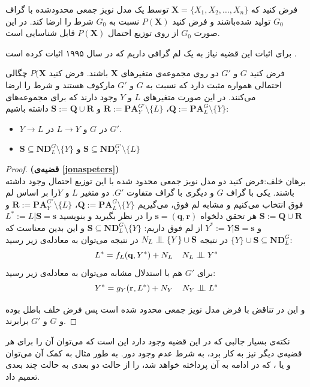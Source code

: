 \documentclass{article}
\begin{document}
\begin{thm}\label{jonaspeters}
فرض کنید که 
$\mathbf{X} = \{X_1, X_2, \dots, X_n\}$
توسط یک مدل‌ نویز جمعی محدود‌شده با گراف $G_0$ تولید شده‌باشند و فرض کنید 
$P(\mathbf{X})$
نسبت به $G_0$ شرط 
را ارضا کند. در این صورت $G_0$ از روی توزیع احتمال $P(\mathbf{X})$ قابل شناسایی است. 
\end{thm}
برای اثبات این قضیه نیاز به یک لم‌ گرافی داریم که 
در سال ۱۹۹۵ اثبات کرده است 
\cite{chickering}.
\begin{lem}
فرض کنید $G$ و $G'$ دو 
روی مجموعه‌ی متغیر‌های  
$\mathbf{X}$
باشند. فرض کنید 
$P(\mathbf{X}$
چگالی احتمالی همواره مثبت دارد که نسبت به $G$ و   $G'$ مارکوف هستند و شرط
را ارضا می‌کنند. در این صورت متغیر‌های $L$ و $Y$  وجود دارند که برای مجموعه‌های 
$\mathbf{Q} := \mathbf{PA}_L^{G}\setminus\{Y\}$،
$\mathbf{R} := \mathbf{PA}_Y^{G'}\setminus\{L\}$
و 
$\mathbf{S} := \mathbf{Q} \cup \mathbf{R} $
داشته باشیم:
\begin{itemize}
\item
$Y \rightarrow L$
	در $G$ و 
$L \rightarrow Y$
	در $G'$.
\item 
$\mathbf{S} \subseteq \mathbf{ND}_L^G \setminus\{Y\}$
	و 
$\mathbf{S}\subseteq  \mathbf{ND}_Y^{G'} \setminus\{L\} $ 
\end{itemize}
\end{lem}

\begin{proof}
	\textbf{
	(قضیه‌ی 
	\eqref{jonaspeters})}
\\
برهان خلف:‌فرض کنید دو مدل نویز جمعی محدود شده با این توزیع احتمال وجود داشته باشند. یکی با گراف $G$ و دیگری با  گراف  متفاوت $G'$. دو متغیر $L$ و $Y$را بر اساس لم فوق انتخاب می‌کنیم و مشابه لم فوق، می‌گیریم
$\mathbf{Q} := \mathbf{PA}_L^{G}\setminus\{Y\}$،
$\mathbf{R} := \mathbf{PA}_Y^{G'}\setminus\{L\}$
و 
$\mathbf{S} := \mathbf{Q} \cup \mathbf{R} $
هر تحقق دلخواه 
$\mathbf{s} = (\mathbf{q}, \mathbf{r})$
را در نظر بگیرید و بنویسید
$L^* := L|\mathbf{S}= \mathbf{s}$
و 
$Y^* := Y|\mathbf{S}= \mathbf{s}$
از لم فوق داریم:
$\mathbf{S} \subseteq \mathbf{ND}_L^G \setminus\{Y\}$
 و این بدین معناست که 
 $\{Y\} \cup \mathbf{S}  \subseteq \mathbf{ND}_L^G$
 در نتیجه 
 $N_L \bigCI \{Y\} \cup \mathbf{S}$
 در نتیجه می‌توان به معادله‌ی زیر رسید:
 $$L^* = f_L(\mathbf{q}, Y^*) + N_L \;\;\;\; N_L\bigCI Y^*$$
 برای $G'$ هم با استدلال مشابه می‌توان به معادله‌ی زیر رسید:
  $$Y^* = g_Y(\mathbf{r}, L^*) + N_Y \;\;\;\; N_Y\bigCI L^*$$
   
   و این در تناقض با فرض مدل نویز جمعی محدود شده است پس فرض خلف باطل بوده و $G$ و $G'$ برابرند.
\end{proof}
نکته‌ی بسیار جالبی که در این قضیه وجود دارد این است که می‌توان آن را برای هر قضیه‌ی 
دیگر نیز به کار برد، به شرط عدم وجود دور. به طور مثال به کمک آن می‌توان
و یا
،
که در ادامه به آن پرداخته خواهد شد، را از حالت دو بعدی به حالت چند بعدی تعمیم داد.
\end{document}
